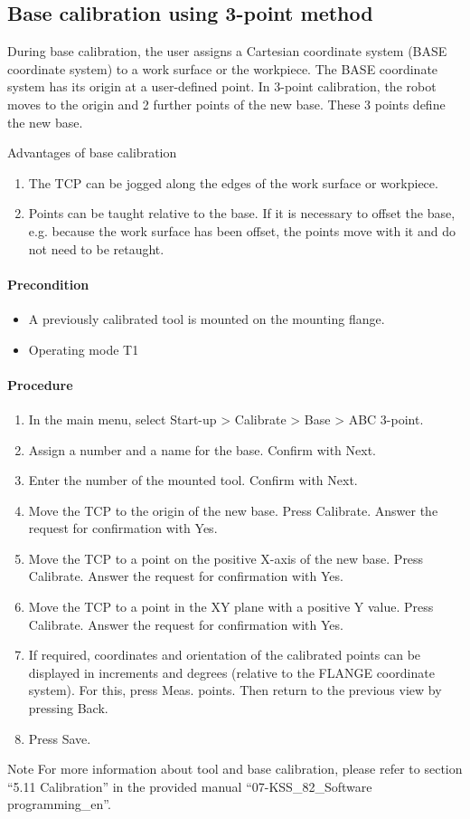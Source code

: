 \subsection{Base calibration using 3-point method}
During base calibration, the user assigns a Cartesian coordinate system (BASE coordinate system) to a work surface or the workpiece. The BASE coordinate system has its origin at a user-defined point. In 3-point calibration, the robot moves to the origin and 2 further points of the new base. These 3 points define the new base.

Advantages of base calibration
\begin{enumerate}
	\item The TCP can be jogged along the edges of the work surface or workpiece.
	\item Points can be taught relative to the base. If it is necessary to offset the base, e.g. because the work surface has been offset, the points move with it and do not need to be retaught.
\end{enumerate}
\paragraph{Precondition}
\begin{itemize}
	\item A previously calibrated tool is mounted on the mounting flange.
	\item Operating mode T1
\end{itemize}
\paragraph{Procedure}
\begin{enumerate}
	\item In the main menu, select Start-up > Calibrate > Base > ABC 3-point.
	\item Assign a number and a name for the base. Confirm with Next.
	\item Enter the number of the mounted tool. Confirm with Next.
	\item Move the TCP to the origin of the new base. Press Calibrate. Answer the request for confirmation with Yes.
	\item Move the TCP to a point on the positive X-axis of the new base. Press Calibrate. Answer the request for confirmation with Yes.
	\item Move the TCP to a point in the XY plane with a positive Y value. Press Calibrate. Answer the request for confirmation with Yes.
	\item If required, coordinates and orientation of the calibrated points can be displayed in increments and degrees (relative to the FLANGE coordinate system). For this, press Meas. points. Then return to the previous view by pressing Back.
	\item Press Save.
\end{enumerate}
\begin{mynotebox}{Note}
    	For more information about tool and base calibration, please refer to section “5.11 Calibration” in the provided manual “07-KSS\_82\_Software programming\_en”.
\end{mynotebox}

